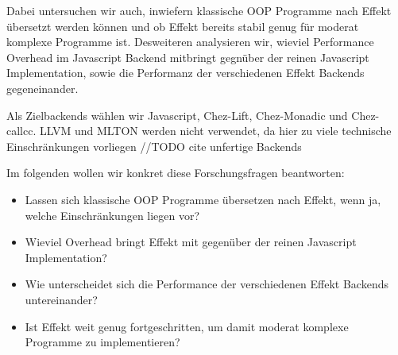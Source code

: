 Dabei untersuchen wir auch, inwiefern klassische OOP Programme nach Effekt übersetzt werden können und ob Effekt bereits stabil genug für moderat komplexe Programme ist.  
Desweiteren analysieren wir, wieviel Performance Overhead im Javascript Backend mitbringt gegnüber der reinen Javascript Implementation, sowie die Performanz der verschiedenen Effekt Backends gegeneinander.

Als Zielbackends wählen wir Javascript, Chez-Lift, Chez-Monadic und Chez-callcc.
LLVM und MLTON werden nicht verwendet, da hier zu viele technische Einschränkungen vorliegen //TODO cite unfertige Backends

Im folgenden wollen wir konkret diese Forschungsfragen beantworten:
\begin{itemize}
    \item Lassen sich klassische OOP Programme übersetzen nach Effekt, wenn ja, welche Einschränkungen liegen vor?
    \item Wieviel Overhead bringt Effekt mit gegenüber der reinen Javascript Implementation?
    \item Wie unterscheidet sich die Performance der verschiedenen Effekt Backends untereinander?
    \item Ist Effekt weit genug fortgeschritten, um damit moderat komplexe Programme zu implementieren?
\end{itemize}


  